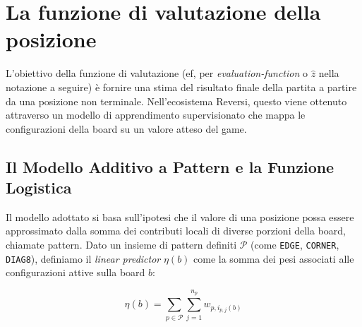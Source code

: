 %
%
%
%
%
%
%
%
\chapter{La funzione di valutazione della posizione}

L'obiettivo della funzione di valutazione (ef, per \textit{evaluation-function} o $\hat{z}$ nella notazione a seguire) è fornire una stima del
risultato finale della partita a partire da una posizione non terminale.
Nell'ecosistema Reversi, questo viene ottenuto attraverso un modello di apprendimento supervisionato che mappa le configurazioni della board
su un valore atteso del game.

\section{Il Modello Additivo a Pattern e la Funzione Logistica}

Il modello adottato si basa sull'ipotesi che il valore di una posizione possa essere approssimato dalla somma dei contributi locali di diverse porzioni della board,
chiamate pattern. Dato un insieme di pattern definiti $\mathcal{P}$ (come \texttt{EDGE}, \texttt{CORNER}, \texttt{DIAG8}),
definiamo il \textit{linear predictor} $\eta(b)$ come la somma dei pesi associati alle configurazioni attive sulla board $b$:

\begin{equation}
\eta(b) = \sum_{p \in \mathcal{P}} \sum_{j=1}^{n_p} w_{p, i_{p,j}(b)}
\end{equation}

